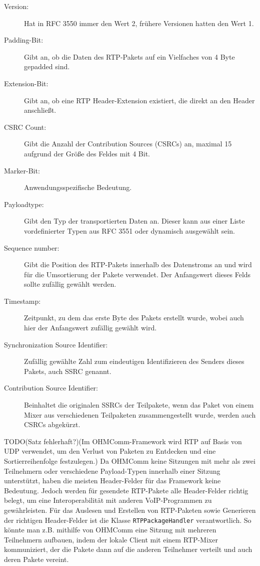 \begin{description}
\item[Version:] Hat in RFC 3550 immer den Wert 2, frühere Versionen hatten den Wert 1.
\item[Padding-Bit:] Gibt an, ob die Daten des RTP-Pakets auf ein Vielfaches von 4 Byte gepadded sind.
\item[Extension-Bit:] Gibt an, ob eine RTP Header-Extension existiert, die direkt an den Header anschließt.
\item[CSRC Count:] Gibt die Anzahl der Contribution Sources (CSRCs) an, maximal 15 aufgrund der Größe des Feldes mit 4 Bit.
\item[Marker-Bit:] Anwendungsspezifische Bedeutung.
\item[Payloadtype:] Gibt den Typ der transportierten Daten an. Dieser kann aus einer Liste vordefinierter Typen aus RFC 3551 oder dynamisch ausgewählt sein.
\item[Sequence number:] Gibt die Position des RTP-Pakets innerhalb des Datenstroms an und wird für die Umsortierung der Pakete verwendet. Der Anfangswert dieses Felds sollte zufällig gewählt werden.
\item[Timestamp:] Zeitpunkt, zu dem das erste Byte des Pakets erstellt wurde, wobei auch hier der Anfangswert zufällig gewählt wird.
\item[Synchronization Source Identifier:] Zufällig gewählte Zahl zum eindeutigen Identifizieren des Senders dieses Pakets, auch SSRC genannt.
\item[Contribution Source Identifier:] Beinhaltet die originalen SSRCs der Teilpakete, wenn das Paket von einem Mixer aus verschiedenen Teilpaketen zusammengestellt wurde, werden auch CSRCs abgekürzt.
\end{description}
TODO(Satz fehlerhaft?)(Im OHMComm-Framework wird RTP auf Basis von UDP verwendet, um den Verlust von Paketen zu Entdecken und eine Sortierreihenfolge festzulegen.) Da OHMComm keine Sitzungen mit mehr als zwei Teilnehmern oder verschiedene Payload-Typen innerhalb einer Sitzung unterstützt, haben die meisten Header-Felder für das Framework keine Bedeutung. Jedoch werden für gesendete RTP-Pakete alle Header-Felder richtig belegt, um eine Interoperabilität mit anderen VoIP-Programmen zu gewährleisten. Für das Auslesen und Erstellen von RTP-Paketen sowie Generieren der richtigen Header-Felder ist die Klasse \texttt{RTPPackageHandler} verantwortlich. So könnte man z.B. mithilfe von OHMComm eine  Sitzung mit mehreren Teilnehmern aufbauen, indem der lokale Client mit einem RTP-Mixer kommuniziert, der die Pakete dann auf die anderen Teilnehmer verteilt und auch deren Pakete vereint.
